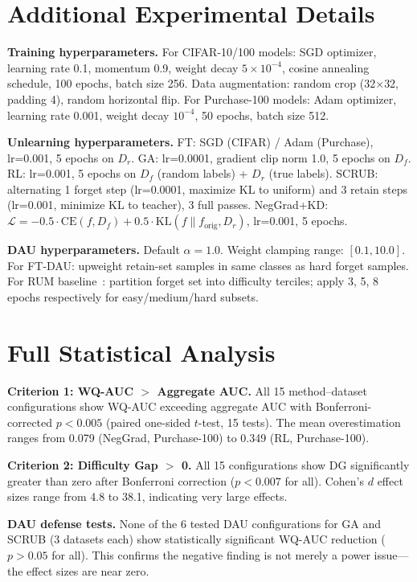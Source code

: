 \documentclass{article}
\begin{document}



\newpage
\appendix

\section{Additional Experimental Details}

\textbf{Training hyperparameters.}
For CIFAR-10/100 models: SGD optimizer, learning rate 0.1, momentum 0.9, weight decay $5 \times 10^{-4}$, cosine annealing schedule, 100 epochs, batch size 256.
Data augmentation: random crop (32$\times$32, padding 4), random horizontal flip.
For Purchase-100 models: Adam optimizer, learning rate 0.001, weight decay $10^{-4}$, 50 epochs, batch size 512.

\textbf{Unlearning hyperparameters.}
FT: SGD (CIFAR) / Adam (Purchase), lr=0.001, 5 epochs on $D_r$.
GA: lr=0.0001, gradient clip norm 1.0, 5 epochs on $D_f$.
RL: lr=0.001, 5 epochs on $D_f$ (random labels) + $D_r$ (true labels).
SCRUB: alternating 1 forget step (lr=0.0001, maximize KL to uniform) and 3 retain steps (lr=0.001, minimize KL to teacher), 3 full passes.
NegGrad+KD: $\mathcal{L} = -0.5 \cdot \text{CE}(f, D_f) + 0.5 \cdot \text{KL}(f \| f_{\text{orig}}, D_r)$, lr=0.001, 5 epochs.

\textbf{DAU hyperparameters.}
Default $\alpha = 1.0$.
Weight clamping range: $[0.1, 10.0]$.
For FT-DAU: upweight retain-set samples in same classes as hard forget samples.
For RUM baseline~\citep{zhao2024what}: partition forget set into difficulty terciles; apply 3, 5, 8 epochs respectively for easy/medium/hard subsets.

\section{Full Statistical Analysis}

\textbf{Criterion 1: WQ-AUC $>$ Aggregate AUC.}
All 15 method--dataset configurations show WQ-AUC exceeding aggregate AUC with Bonferroni-corrected $p < 0.005$ (paired one-sided $t$-test, 15 tests).
The mean overestimation ranges from 0.079 (NegGrad, Purchase-100) to 0.349 (RL, Purchase-100).

\textbf{Criterion 2: Difficulty Gap $>$ 0.}
All 15 configurations show DG significantly greater than zero after Bonferroni correction ($p < 0.007$ for all).
Cohen's $d$ effect sizes range from 4.8 to 38.1, indicating very large effects.

\textbf{DAU defense tests.}
None of the 6 tested DAU configurations for GA and SCRUB (3 datasets each) show statistically significant WQ-AUC reduction ($p > 0.05$ for all).
This confirms the negative finding is not merely a power issue---the effect sizes are near zero.
\end{document}
